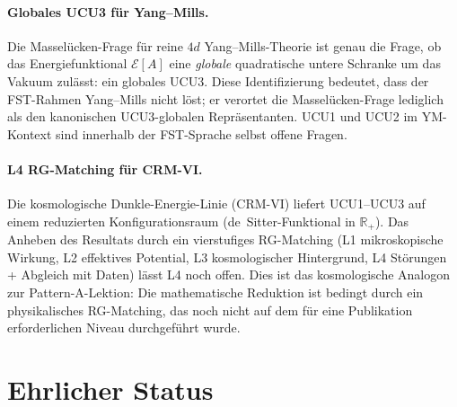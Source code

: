 \documentclass[11pt,a4paper]{article}
\theoremstyle{remark}
\begin{document}
\paragraph{Globales UCU3 für Yang--Mills.}
Die Masselücken-Frage für reine $4d$ Yang--Mills-Theorie ist genau die Frage, ob das Energiefunktional $\mathcal{E}[A]$ eine \emph{globale} quadratische untere Schranke um das Vakuum zulässt: ein globales UCU3. Diese Identifizierung bedeutet, dass der FST-Rahmen Yang--Mills nicht löst; er verortet die Masselücken-Frage lediglich als den kanonischen UCU3-globalen Repräsentanten. UCU1 und UCU2 im YM-Kontext sind innerhalb der FST-Sprache selbst offene Fragen.

\paragraph{L4 RG-Matching für CRM-VI.}
Die kosmologische Dunkle-Energie-Linie (CRM-VI) liefert UCU1--UCU3 auf einem reduzierten Konfigurationsraum (de~Sitter-Funktional in $\mathbb{R}_+$). Das Anheben des Resultats durch ein vierstufiges RG-Matching (L1 mikroskopische Wirkung, L2 effektives Potential, L3 kosmologischer Hintergrund, L4 Störungen + Abgleich mit Daten) lässt L4 noch offen. Dies ist das kosmologische Analogon zur Pattern-A-Lektion: Die mathematische Reduktion ist bedingt durch ein physikalisches RG-Matching, das noch nicht auf dem für eine Publikation erforderlichen Niveau durchgeführt wurde.

\section{Ehrlicher Status}
\label{sec:honest-status}
\end{document}
